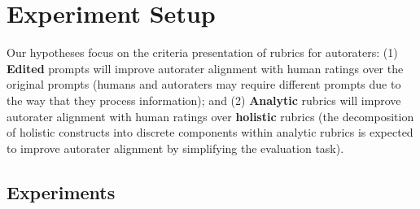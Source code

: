 
\section{Experiment Setup}


Our hypotheses focus on the criteria presentation of rubrics for autoraters:
(1) \textbf{Edited} prompts will improve autorater alignment with human ratings over the original prompts (humans and autoraters may require different prompts due to the way that they process information); and 
(2) \textbf{Analytic} rubrics will improve autorater alignment with human ratings over \textbf{holistic} rubrics (the decomposition of holistic constructs into discrete components within analytic rubrics is expected to improve autorater alignment by simplifying the evaluation task).

\subsection{Experiments}
\label{sec:experiments}

